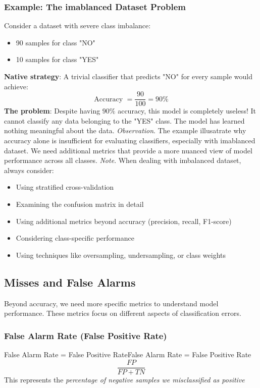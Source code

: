 \documentclass[a4paper]{article}
\theoremstyle{definition}
\begin{document}
\subsubsection{Example: The imablanced Dataset Problem}
Consider a dataset with severe class imbalance:
\begin{itemize}
    \item 90 samples for class "NO"
    \item 10 samples for class "YES"
\end{itemize}
\textbf{Native strategy}: A trivial classifier that predicts "NO" for every sample would achieve:
\[
  \text{Accuracy } = \frac{90}{100} = 90\%
\]
\textbf{The problem}: Despite having \( 90\% \) accuracy, this model is completely useless! It cannot 
classify any data belonging to the "YES" class. The model has learned nothing meaningful about the data.
\vspace{1em}
\noindent
\newline
\textit{Observation}. The example illusatrate why accuracy alone is insufficient for evaluating classifiers,
especially with imablanced dataset. We need additional metrics that provide a more nuanced view of model 
performance across all classes.
\vspace{1em}
\noindent
\newline
\textit{Note}. When dealing with imbalanced dataset, always consider:
\begin{itemize}
    \item Using stratified cross-validation 
    \item Examining the confusion matrix in detail
    \item Using additional metrics beyond accuracy (precision, recall, F1-score)
    \item Considering class-specific performance 
    \item Using techniques like oversampling, undersampling, or class weights
\end{itemize}
\subsection{Misses and False Alarms}
Beyond accuracy, we need more specific metrics to understand model performance. These metrics focus on different aspects of classification
errors.
\subsubsection{False Alarm Rate (False Positive Rate)}
\begin{definition}{False Alarm Rate = False Positive Rate}{False Alarm Rate = False Positive Rate}
\[
  \frac{FP}{FP + TN}
\]
This represents the \textit{percentage of negative samples we misclassified as positive}
\end{definition}
\end{document}
